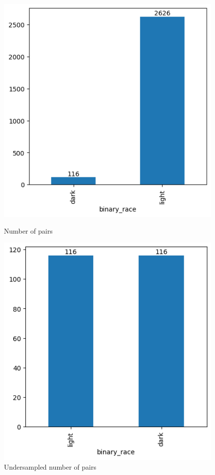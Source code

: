 \documentclass[conference]{IEEEtran}
\begin{document}
\begin{figure}[hbt!]\captionsetup[subfigure]{font=footnotesize}
  \centering
  \begin{minipage}{.5\columnwidth}
    \centering
    \includegraphics[width=\linewidth]{latex/images/NonUniformNumberOfPairings.png}
    \caption{Number of pairs}
    \label{num_pairings}
  \end{minipage}%
  \hfill
  \begin{minipage}{.5\columnwidth}
    \centering
    \includegraphics[width=\linewidth]{latex/images/UniformNumberOfPairings.png}
    \caption{Undersampled number of pairs}
    \label{num_pairings_undersampled}
  \end{minipage}%
\end{figure}
\end{document}
